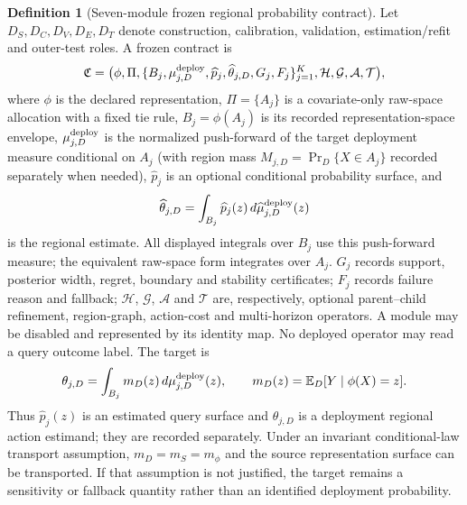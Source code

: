 \documentclass[11pt,a4paper]{article}
\newcommand{\E}{\mathbb E}\newcommand{\Pp}{\mathbb P}
\numberwithin{equation}{section}
\theoremstyle{definition}\newtheorem{definition}[theorem]{Definition}
\theoremstyle{remark}\newtheorem{remark}[theorem]{Remark}
\begin{document}
\begin{definition}[Seven-module frozen regional probability contract]\label{def:sevencontract}
Let $D_S,D_C,D_V,D_E,D_T$ denote construction, calibration, validation, estimation/refit and outer-test roles. A frozen contract is
\[
\mathfrak C=\bigl(\phi,\Pi,\{B_j,\mu_{j,D}^{\rm deploy},\widehat p_j,\widehat\theta_{j,D},G_j,F_j\}_{j=1}^K,\mathcal H,\mathcal G,\mathcal A,\mathcal T\bigr),
\]
where $\phi$ is the declared representation, $\Pi=\{A_j\}$ is a covariate-only raw-space allocation with a fixed tie rule, $B_j=\phi(A_j)$ is its recorded representation-space envelope, $\mu_{j,D}^{\rm deploy}$ is the normalized push-forward of the target deployment measure conditional on $A_j$ (with region mass $M_{j,D}=\Pr_D\{X\in A_j\}$ recorded separately when needed), $\widehat p_j$ is an optional conditional probability surface, and
\[
\widehat\theta_{j,D}=\int_{B_j}\widehat p_j(z)\,d\widehat\mu_{j,D}^{\rm deploy}(z)
\]
is the regional estimate. All displayed integrals over $B_j$ use this push-forward measure; the equivalent raw-space form integrates over $A_j$. $G_j$ records support, posterior width, regret, boundary and stability certificates; $F_j$ records failure reason and fallback; $\mathcal H$, $\mathcal G$, $\mathcal A$ and $\mathcal T$ are, respectively, optional parent--child refinement, region-graph, action-cost and multi-horizon operators. A module may be disabled and represented by its identity map. No deployed operator may read a query outcome label. The target is
\[
\theta_{j,D}=\int_{B_j}m_D(z)\,d\mu_{j,D}^{\rm deploy}(z),\qquad m_D(z)=\E_D[Y\mid\phi(X)=z].
\]
Thus $\widehat p_j(z)$ is an estimated query surface and $\theta_{j,D}$ is a deployment regional action estimand; they are recorded separately. Under an invariant conditional-law transport assumption, $m_D=m_S=m_\phi$ and the source representation surface can be transported. If that assumption is not justified, the target remains a sensitivity or fallback quantity rather than an identified deployment probability.
\end{definition}
\end{document}
